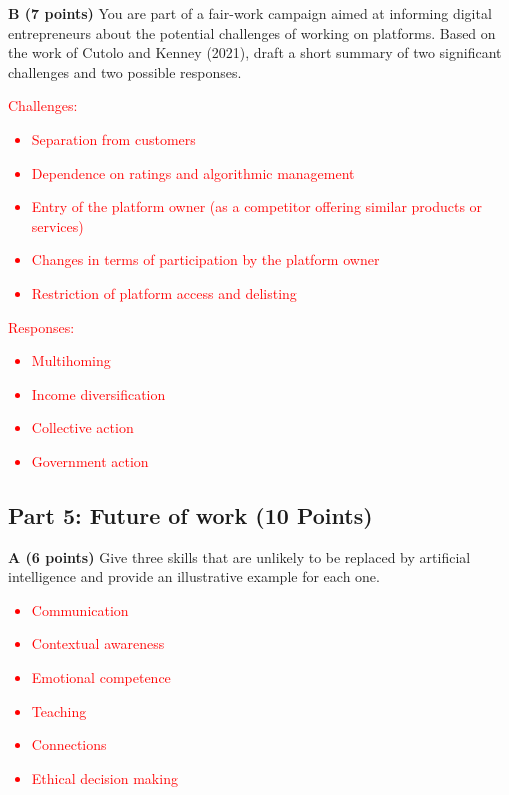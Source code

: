 \documentclass[12pt]{scrartcl}
\begin{document}
\vspace{0.3cm}
\newpage
\textbf{B (7 points)} You are part of a fair-work campaign aimed at informing digital entrepreneurs about the potential challenges of working on platforms. Based on the work of Cutolo and Kenney (2021), draft a short summary of two significant challenges and two possible responses.


\textcolor{red}{
	Challenges:
	\begin{itemize}
		\item Separation from customers
		\item Dependence on ratings and algorithmic management
		\item Entry of the platform owner (as a competitor offering similar products or services)
		\item Changes in terms of participation by the platform owner
		\item Restriction of platform access and delisting
	\end{itemize}
	Responses:
	\begin{itemize}
	\item Multihoming
	\item Income diversification
	\item Collective action
	\item Government action
	\end{itemize}
}

\subsection*{Part 5: Future of work (10 Points)}

\textbf{A (6 points)} Give three skills that are unlikely to be replaced by artificial intelligence and provide an illustrative example for each one.

\textcolor{red}{
	\begin{itemize}
		\item Communication
		\item Contextual awareness
		\item Emotional competence
		\item Teaching
		\item Connections
		\item Ethical decision making
	\end{itemize}
}
\end{document}
